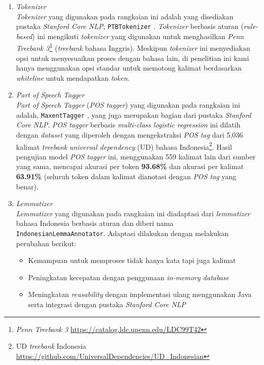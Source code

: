 \begin{enumerate}

\item \textit{Tokenizer} \\
\textit{Tokenizer} yang digunakan pada rangkaian ini adalah yang disediakan pustaka \textit{Stanford Core NLP}, \verb|PTBTokenizer| \citep{manningptbtokenizer}. \textit{Tokenizer} berbasis aturan (\textit{rule-based}) ini mengikuti \textit{tokenizer} yang digunakan untuk menghasilkan \textit{Penn Treebank 3}\footnote{\textit{Penn Treebank 3} \url{https://catalog.ldc.upenn.edu/LDC99T42}} (\textit{treebank} bahasa Inggris). Meskipun \textit{tokenizer} ini menyediakan opsi untuk menyesuaikan proses dengan bahasa lain, di penelitian ini kami hanya menggunakan opsi standar untuk memotong kalimat berdasarkan \textit{whiteline} untuk mendapatkan \textit{token}.

\item \textit{Part of Speech Tagger} \\ 
\textit{Part of Speech Tagger} (\textit{POS tagger}) yang digunakan pada rangkaian ini adalah, \verb|MaxentTagger| \citep{toutanova2003feature}, yang juga merupakan bagian dari pustaka \textit{Stanford Core NLP}. \textit{POS tagger} berbasis \textit{multi-class logistic regression} ini dilatih dengan \textit{dataset} yang diperoleh dengan mengekstraksi \textit{POS tag} dari 5,036 kalimat \textit{treebank} \textit{universal dependency} (UD) bahasa Indonesia\footnote{UD \textit{treebank} Indonesia \url{https://github.com/UniversalDependencies/UD_Indonesian}}. Hasil pengujian model \textit{POS tagger} ini, menggunakan 559 kalimat lain dari sumber yang sama, mencapai akurasi per token \textbf{93.68\%} dan akurasi per kalimat \textbf{63.91\%} (seluruh token dalam kalimat dianotasi dengan \textit{POS tag} yang benar).

\item \textit{Lemmatizer} \\
\textit{Lemmatizer} yang digunakan pada rangkaian ini diadaptasi dari \textit{lemmatizer} bahasa Indonesia berbasis aturan \citep{suhartono2014lemmatization} dan diberi nama \verb|IndonesianLemmaAnnotator|. Adaptasi dilakukan dengan melakukan perubahan berikut:

\begin{itemize}
\item Kemampuan untuk memproses tidak hanya kata tapi juga kalimat
\item Peningkatan kecepatan dengan penggunaan \textit{in-memory database}
\item Meningkatan \textit{reusability} dengan implementasi ulang menggunakan Java serta integrasi dengan pustaka \textit{Stanford Core NLP}
\end{itemize}


\end{enumerate}
